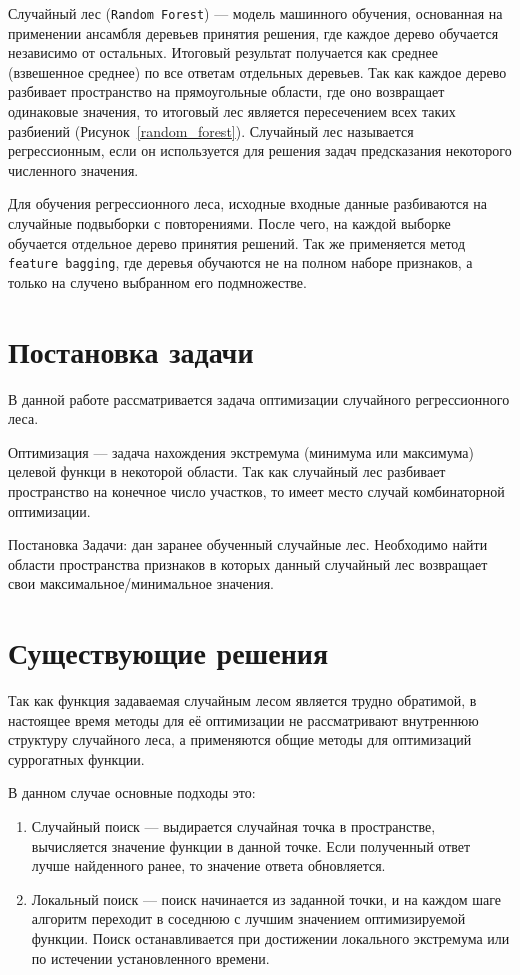 Случайный лес (\texttt{Random Forest}\cite{randomforest}) --- модель машинного
обучения, основанная на применении ансамбля деревьев принятия решения, где
каждое дерево обучается независимо от остальных. Итоговый результат получается
как среднее (взвешенное среднее) по все ответам отдельных деревьев. Так как
каждое дерево разбивает пространство на прямоугольные области, где оно
возвращает одинаковые значения, то итоговый лес является пересечением всех таких
разбиений (Рисунок~\ref{random_forest}). Случайный лес называется регрессионным,
если он используется для решения задач предсказания некоторого численного
значения.

Для обучения регрессионного леса, исходные входные данные разбиваются на случайные
подвыборки с повторениями. После чего, на каждой выборке обучается отдельное
дерево принятия решений. Так же применяется метод \texttt{feature bagging}, где
деревья обучаются не на полном наборе признаков, а только на случено выбранном
его подмножестве.

\section{Постановка задачи}

В данной работе рассматривается задача оптимизации случайного регрессионного
леса.

Оптимизация --- задача нахождения экстремума (минимума или максимума) целевой
функци в некоторой области. Так как случайный лес разбивает пространство на
конечное число участков, то имеет место случай комбинаторной оптимизации.

Постановка Задачи: дан заранее обученный случайные лес. Необходимо найти области
пространства признаков в которых данный случайный лес возвращает свои
максимальное/минимальное значения.

\section{Существующие решения}

Так как функция задаваемая случайным лесом является трудно обратимой,
в настоящее время методы для её оптимизации не рассматривают внутреннюю
структуру случайного леса, а применяются общие методы для оптимизаций суррогатных
функции.

В данном случае основные подходы это:
\begin{enumerate}
    \item Случайный поиск --- выдирается случайная точка в пространстве,
    вычисляется значение функции в данной точке. Если полученный ответ лучше
    найденного ранее, то значение ответа обновляется.
    \item Локальный поиск --- поиск начинается из заданной точки, и на каждом шаге
    алгоритм переходит в соседнюю с лучшим значением оптимизируемой функции. Поиск
    останавливается при достижении локального экстремума или по истечении
    установленного времени.
\end{enumerate}

